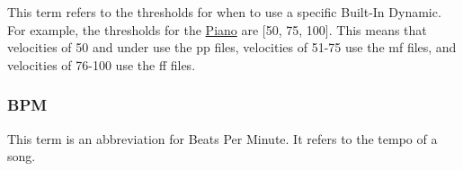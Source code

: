 This term refers to the thresholds for when to use a specific Built-\/\+In Dynamic. For example, the thresholds for the \hyperlink{class_piano}{Piano} are \mbox{[}50, 75, 100\mbox{]}. This means that velocities of 50 and under use the pp files, velocities of 51-\/75 use the mf files, and velocities of 76-\/100 use the ff files.\hypertarget{group___audio_DefBPM}{}\subsubsection{B\+PM}\label{group___audio_DefBPM}
This term is an abbreviation for Beats Per Minute. It refers to the tempo of a song. 